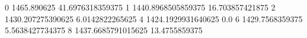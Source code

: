 0 1465.890625 41.6976318359375
1 1440.8968505859375 16.703857421875
2 1430.207275390625 6.0142822265625
4 1424.1929931640625 0.0
6 1429.7568359375 5.5638427734375
8 1437.6685791015625 13.4755859375
